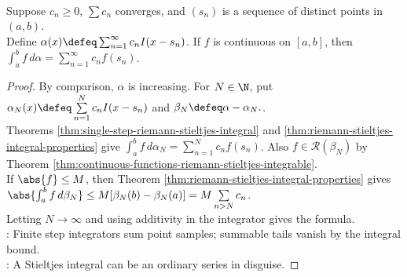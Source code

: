\begin{theorem} \label{thm:pure-step-riemann-stieltjes-series} \\
Suppose $c_n\geq0$, $\sum c_n$ converges, and $(s_n)$ is a sequence of distinct points in $(a,b)$.\\
Define $\alpha(x)\defeq\sum_{n=1}^{\infty}c_n I(x-s_n)$. If $f$ is continuous on $[a,b]$, then $\int_a^b f\,d\alpha=\sum\limits_{n=1}^{\infty}c_nf(s_n)$.
\begin{proof}
By comparison, $\alpha$ is increasing. For $N\in\N$, put $\alpha_N(x)\defeq\sum\limits_{n=1}^{N}c_n I(x-s_n)$ and $\beta_N\defeq\alpha-\alpha_N.$.\\
Theorems \ref{thm:single-step-riemann-stieltjes-integral} and \ref{thm:riemann-stieltjes-integral-properties} give $\int_a^b f\,d\alpha_N=\sum\limits_{n=1}^{N}c_nf(s_n)$. Also $f\in\mathcal{R}(\beta_N)$ by Theorem \ref{thm:continuous-functions-riemann-stieltjes-integrable}.\\
If $\abs{f}\leq M$, then Theorem \ref{thm:riemann-stieltjes-integral-properties} gives $\abs{\int_a^b f\,d\beta_N}\leq M[\beta_N(b)-\beta_N(a)]=M\sum\limits_{n>N}c_n$.\\
Letting $N\to\infty$ and using additivity in the integrator gives the formula.\\
: Finite step integrators sum point samples; summable tails vanish by the integral bound.\\
: A Stieltjes integral can be an ordinary series in disguise.
\end{proof}
\end{theorem}

